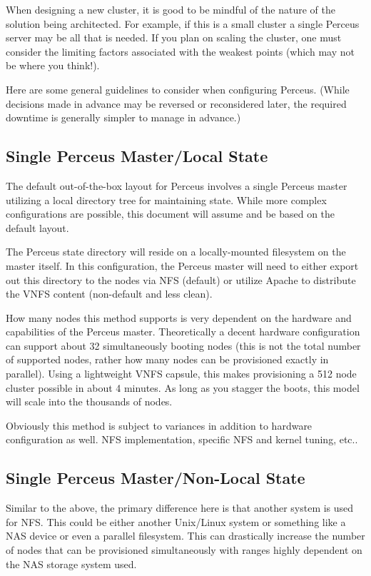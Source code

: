 \documentclass[10pt,letterpaper]{report}
\begin{document}
When designing a new cluster, it is good to be mindful of the nature of the
solution being architected.  For example, if this is a small cluster a single
Perceus server may be all that is needed. If you plan on scaling the cluster,
one must consider the limiting factors associated with the weakest points
(which may not be where you think!).

Here are some general guidelines to consider when configuring Perceus.  (While
decisions made in advance may be reversed or reconsidered later, the required
downtime is generally simpler to manage in advance.)

\subsection{Single Perceus Master/Local State}
The default out-of-the-box layout for Perceus involves a single Perceus master
utilizing a local directory tree for maintaining state.  While more complex
configurations are possible, this document will assume and be based on the
default layout.

The Perceus state directory will reside on a locally-mounted filesystem on the
master itself. In this configuration, the Perceus master will need to either
export out this directory to the nodes via NFS (default) or utilize Apache to
distribute the VNFS content (non-default and less clean).

How many nodes this method supports is very dependent on the hardware and
capabilities of the Perceus master.  Theoretically a decent hardware
configuration can support about 32 simultaneously booting nodes (this is not
the total number of supported nodes, rather how many nodes can be provisioned
exactly in parallel). Using a lightweight VNFS capsule, this makes provisioning
a 512 node cluster possible in about 4 minutes. As long as you stagger the
boots, this model will scale into the thousands of nodes.

Obviously this method is subject to variances in addition to hardware
configuration as well. NFS implementation, specific NFS and kernel tuning,
etc..

\subsection{Single Perceus Master/Non-Local State}
Similar to the above, the primary difference here is that another system is
used for NFS. This could be either another Unix/Linux system or something like
a NAS device or even a parallel filesystem. This can drastically increase the
number of nodes that can be provisioned simultaneously with ranges highly
dependent on the NAS storage system used.
\end{document}
